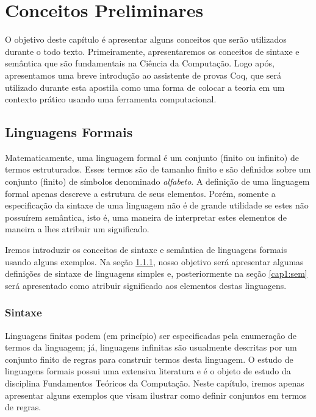 \chapter{Conceitos Preliminares}

O objetivo deste cap\'itulo \'e apresentar alguns conceitos que ser\~ao utilizados durante o todo texto. Primeiramente,
apresentaremos os conceitos de sintaxe e sem\^antica que s\~ao fundamentais na Ci\^encia da Computa\c{c}\~ao. Logo ap\'os,
apresentamos uma breve introdu\c{c}\~ao ao assistente de provas Coq, que ser\'a utilizado durante esta apostila como uma
forma de colocar a teoria em um contexto pr\'atico usando uma ferramenta computacional.

\section{Linguagens Formais}

Matematicamente, uma linguagem formal \'e um conjunto (finito ou infinito) de termos estruturados. Esses
termos s\~ao de tamanho finito e s\~ao definidos sobre um conjunto (finito) de s\'imbolos denominado \textit{alfabeto}.
A defini\c{c}\~ao de uma linguagem formal apenas descreve a estrutura de seus elementos. Por\'em, somente a especifica\c{c}\~ao
da sintaxe de uma linguagem n\~ao \'e de grande utilidade se estes n\~ao possu\'irem sem\^antica, isto \'e, uma maneira de
interpretar estes elementos de maneira a lhes atribuir um significado. 

Iremos introduzir os conceitos de sintaxe e sem\^antica de linguagens formais usando alguns exemplos.
Na se\c{c}\~ao \ref{cap1:syn}, nosso objetivo ser\'a apresentar
algumas defini\c{c}\~oes de sintaxe de linguagens simples e, posteriormente na se\c{c}\~ao \ref{cap1:sem} ser\'a apresentado como
atribuir significado aos elementos destas linguagens.

\subsection{Sintaxe}\label{cap1:syn}

Linguagens finitas podem (em princ\'ipio) ser especificadas pela enumera\c{c}\~ao de termos da linguagem; j\'a, linguagens
infinitas s\~ao usualmente descritas por um conjunto finito de regras para construir termos desta linguagem.
O estudo de linguagens formais possui uma extensiva literatura e \'e o objeto de estudo da disciplina Fundamentos Te\'oricos da Computa\c{c}\~ao.
Neste cap\'itulo, iremos apenas apresentar alguns exemplos que visam ilustrar como definir conjuntos em termos de regras.


